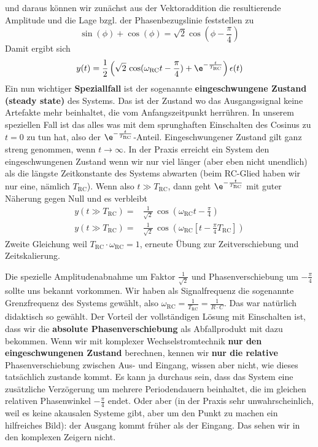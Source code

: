 \begin{Loesung}
\begin{itemize}
\begin{center}
\begin{tikzpicture}[scale=2]
\end{tikzpicture}
\end{center}
und daraus können wir zunächst aus der Vektoraddition die resultierende Amplitude und
die Lage bzgl. der Phasenbezugslinie feststellen zu
\begin{equation}
  \sin(\phi) + \cos(\phi) = \sqrt{2} \cos(\phi-\frac{\pi}{4})
\end{equation}
Damit ergibt sich
\begin{align}
  y(t) = \frac{1}{2}\left(
  \sqrt{2}\,\cos(\omega_\mathrm{RC} t - \frac{\pi}{4}) + \e^{-\frac{t}{T_\mathrm{RC}}}
  \right) \epsilon(t)
\end{align}
Ein nun wichtiger \textbf{Speziallfall} ist der sogenannte \textbf{eingeschwungene
Zustand (steady state)} des Systems.
%
Das ist der Zustand wo das Ausgangssignal keine Artefakte mehr beinhaltet, die
vom Anfangszeitpunkt herrühren.
In unserem speziellen Fall ist das alles was mit dem sprunghaften Einschalten
des Cosinus zu $t=0$ zu tun hat, also der
$\e^{-\frac{t}{T_\mathrm{RC}}}$-Anteil.
%
Eingeschwungener Zustand gilt ganz streng genommen, wenn $t\to\infty$.
In der Praxis erreicht ein System den eingeschwungenen Zustand wenn wir nur viel
länger (aber eben nicht unendlich) als die längste Zeitkonstante des Systems
abwarten (beim RC-Glied haben wir nur eine, nämlich $T_\mathrm{RC}$).
%
Wenn also $t \gg T_\mathrm{RC}$,
dann geht $\e^{-\frac{t}{T_\mathrm{RC}}}$ mit guter Näherung gegen Null
und es verbleibt
\begin{align}
  y(t \gg T_\mathrm{RC}) =& \frac{1}{\sqrt{2}} \,\cos(\omega_\mathrm{RC} t - \frac{\pi}{4})\\
  y(t \gg T_\mathrm{RC}) =& \frac{1}{\sqrt{2}} \,\cos(\omega_\mathrm{RC} \left[t - \frac{\pi}{4} T_\mathrm{RC}\right])
\end{align}
Zweite Gleichung weil $T_\mathrm{RC}\cdot \omega_\mathrm{RC} =1$, erneute Übung
zur Zeitverschiebung und Zeitskalierung.

Die spezielle Amplitudenabnahme um Faktor $\frac{1}{\sqrt{2}}$ und Phasenverschiebung
um $-\frac{\pi}{4}$ sollte uns bekannt vorkommen. Wir haben als Signalfrequenz
die sogenannte Grenzfrequenz des Systems gewählt, also
$\omega_\mathrm{RC} = \frac{1}{T_\mathrm{RC}} = \frac{1}{R \cdot C}$.
Das war natürlich didaktisch so gewählt.
%
Der Vorteil der vollständigen Lösung mit Einschalten ist, dass wir
die \textbf{absolute Phasenverschiebung} als Abfallprodukt mit dazu bekommen.
%
Wenn wir mit komplexer Wechselstromtechnik \textbf{nur den eingeschwungenen Zustand}
berechnen, kennen wir \textbf{nur die relative} Phasenverschiebung
zwischen Aus- und Eingang, wissen aber nicht, wie dieses tatsächlich zustande kommt.
Es kann ja durchaus sein, dass das System eine zusätzliche Verzögerung
um mehrere Periodendauern beinhaltet,
die im gleichen relativen Phasenwinkel $-\frac{\pi}{4}$ endet.
Oder aber (in der Praxis sehr
unwahrscheinlich, weil es keine akausalen Systeme gibt, aber um den Punkt zu machen
ein hilfreiches Bild): der Ausgang kommt früher als der Eingang.
Das sehen wir in den komplexen Zeigern nicht.


\end{itemize}
\end{Loesung}
